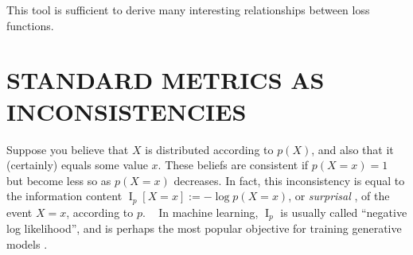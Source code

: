 \documentclass[twoside]{article}
\theoremstyle{plain}
\theoremstyle{definition}
\DeclareMathOperator{\I}{\mathrm{I}} %
\newcommand{\mat}[1]{\mathbf{#1}}
\begin{document}
This tool is sufficient to derive many interesting relationships between loss functions.
\section{STANDARD METRICS AS INCONSISTENCIES}

\def\xsamp{{\mathcal D}}
\def\xysamp{{\mathcal D}}

Suppose you believe that $X$ is distributed according to $p(X)$,
and also that it (certainly) equals some value $x$. These beliefs are consistent if $p(X\!\!=\!x) =\! 1$
but become less so
 as $p(X\!\!=\!x)$ decreases.
In fact, this inconsistency
is equal to
the
information content  $\I_p[X\!\!=\!x] := -\log p(X\!\!=\!x)$, or \emph{surprisal} \parencite{tribus1961information}, of the event $X \!\!=\! x$,
according to $p$.%
\footnotemark\
In machine learning, $\I_p$ is usually called ``negative log
likelihood'', and is perhaps the most popular objective for training
generative models
\parencite{deepgennotes,myung2003tutorial}.%
\end{document}
